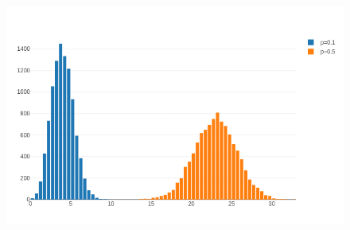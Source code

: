 \begin{figure}[H]
\centering
\includegraphics[scale=0.55]{images/max_flow_04_08.png}
\end{figure}



